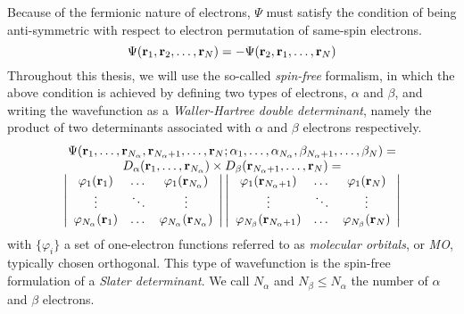 \documentclass[./thesis.tex]{subfiles}
\begin{document}
Because of the fermionic nature of electrons, $\Psi$ must satisfy the condition of being anti-symmetric with respect to electron permutation of same-spin electrons.
\begin{equation}
\Psi({\bf r}_1, {\bf r}_2,\dots,{\bf r}_N) = -\Psi({\bf r}_2, {\bf r}_1,\dots,{\bf r}_N)
\end{equation}
Throughout this thesis, we will use the so-called \emph{spin-free} formalism, in which the above condition is achieved by defining two types of electrons, $\alpha$ and $\beta$, and writing the wavefunction as a \emph{Waller-Hartree double determinant},\cite{Pauncz_1989} namely the product of two determinants associated with $\alpha$ and $\beta$ electrons respectively.
\begin{equation}
\begin{array}{c}
 \Psi({\bf r}_1,\dots,{\bf r}_{{N_\alpha}},{\bf r}_{{N_\alpha}+1},\dots,{\bf r}_N;
      \alpha_1,\dots,\alpha_{{N_\alpha}},\beta_{{N_\alpha}+1},\dots,\beta_N) = \\
D_\alpha({\bf r}_1,\dots,{\bf r}_{{N_\alpha}}) \times D_\beta({\bf r}_{{N_\alpha}+1},\dots,{\bf r}_N) = \\
\left|
 \begin{array}{ccc}
 \varphi_1({\bf r}_1) & \dots & \varphi_1({\bf r}_{{N_\alpha}}) \\
 \vdots               & \ddots &   \vdots             \\
 \varphi_{{N_\alpha}}({\bf r}_1) & \dots & \varphi_{{N_\alpha}}({\bf r}_{{N_\alpha}}) \\
 \end{array}
\right|
\left|
 \begin{array}{ccc}
 \varphi_1({\bf r}_{{N_\alpha}+1}) & \dots & \varphi_1({\bf r}_{N}) \\
 \vdots               & \ddots &   \vdots             \\
 \varphi_{N_\beta}({\bf r}_{{N_\alpha}+1}) & \dots & \varphi_{N_\beta}({\bf r}_{N}) \\
 \end{array}
\right| \\ 
\end{array} \\
\label{eq:slater}
\end{equation}
with $\{ \varphi_i \}$ a set of one-electron functions referred to as \emph{molecular orbitals}, or \emph{MO}, typically chosen orthogonal. This type of wavefunction is the spin-free formulation of a \emph{Slater determinant}. We call $N_\alpha$ and $N_\beta \leq N_\alpha$ the number of $\alpha$ and $\beta$ electrons.
\end{document}
